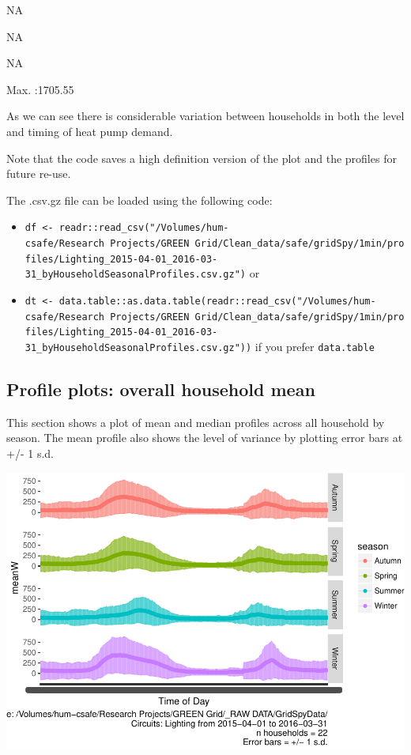 \documentclass[]{article}
\providecommand{\tightlist}{%
  \setlength{\itemsep}{0pt}\setlength{\parskip}{0pt}}
\begin{document}
NA

NA

NA

Max. :1705.55

As we can see there is considerable variation between households in both
the level and timing of heat pump demand.

Note that the code saves a high definition version of the plot and the
profiles for future re-use.

The .csv.gz file can be loaded using the following code:

\begin{itemize}
\tightlist
\item
  \texttt{df\ \textless{}-\ readr::read\_csv("/Volumes/hum-csafe/Research\ Projects/GREEN\ Grid/Clean\_data/safe/gridSpy/1min/profiles/Lighting\_2015-04-01\_2016-03-31\_byHouseholdSeasonalProfiles.csv.gz")}
  or
\item
  \texttt{dt\ \textless{}-\ data.table::as.data.table(readr::read\_csv("/Volumes/hum-csafe/Research\ Projects/GREEN\ Grid/Clean\_data/safe/gridSpy/1min/profiles/Lighting\_2015-04-01\_2016-03-31\_byHouseholdSeasonalProfiles.csv.gz"))}
  if you prefer \texttt{data.table}
\end{itemize}

\subsection{Profile plots: overall household
mean}\label{profile-plots-overall-household-mean}

This section shows a plot of mean and median profiles across all
household by season. The mean profile also shows the level of variance
by plotting error bars at +/- 1 s.d.

\includegraphics{nzGGHouseholdPowerDemandProfile_Lighting_2015-04-01_2016-03-31_files/figure-latex/overall profiles by season-1.pdf}
\end{document}
